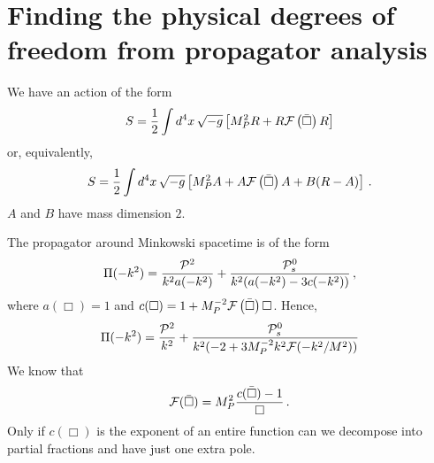 \documentclass[a4paper,12pt]{article}
\newcommand{\bbox}{\bar{\Box}}
\newcommand{\be}{\begin{equation}}
\newcommand{\ee}{\end{equation}}
\newcommand{\cF}{{\cal F}}
\newcommand{\cP}{{\cal P}}
\newcommand{\+}{^{\dagger}}
\newcommand{\LT}{\left[}
\newcommand{\RT}{\right]}
\newcommand{\2}{\frac{1}{2}}
\newcommand{\3}{\frac{1}{3}}
\newcommand{\4}{\frac{1}{4}}
\newcommand{\6}{\frac{1}{6}}
\newcommand{\8}{\frac{1}{8}}
\begin{document}

\section{Finding the  physical degrees of freedom from propagator
analysis}\label{appendixc}
 

We have an action of the form~\cite{Biswas:2005qr}
\be
S=\frac{1}{2} \int d^{4}x \, \sqrt{-g} \LT M_{P}^{2}R +R\cF\left(\bbox\right)R \RT
\ee
or, equivalently,
\be \label{luwo}
S=\frac{1}{2} \int d^{4}x \, \sqrt{-g} \LT M_{P}^{2}A +A\cF\left( \bbox
\right)A +B(R-A)\RT \,.
\ee
$A$ and $B$ have mass dimension $2$.

The propagator around Minkowski spacetime is of the form~\cite{Biswas:2011ar,Biswas:2013kla}
\be
\Pi (-k^2)=\frac{\cP ^ 2}{k^{2}a(-k^2)}+\frac{\cP_{s} ^ 0}{k^{2}(a(-k^2)-3c(-k^2))} \,,
\ee
where $a(\Box)=1$ and $c(\Box)=1+M_{P}^{-2}\cF \left( \bbox \right)\Box$.
Hence,
\be \label{ol}
\Pi (-k^2)=\frac{\cP ^ 2}{k^{2}}+\frac{\cP_{s} ^ 0}{k^{2}(-2+3M_{P}^{-2}k^{2}\cF(-k^{2}/M^{2}))}
\ee
We know that~\cite{Biswas:2011ar,Biswas:2013kla}
\be
\cF (\bar{\Box})=M_{P}^{2}\frac{c(\bar{\Box})-1}{\Box} \,.
\ee
Only if $c(\Box)$ is the exponent of an entire function can we decompose into partial fractions and have just one extra pole.
\end{document}
